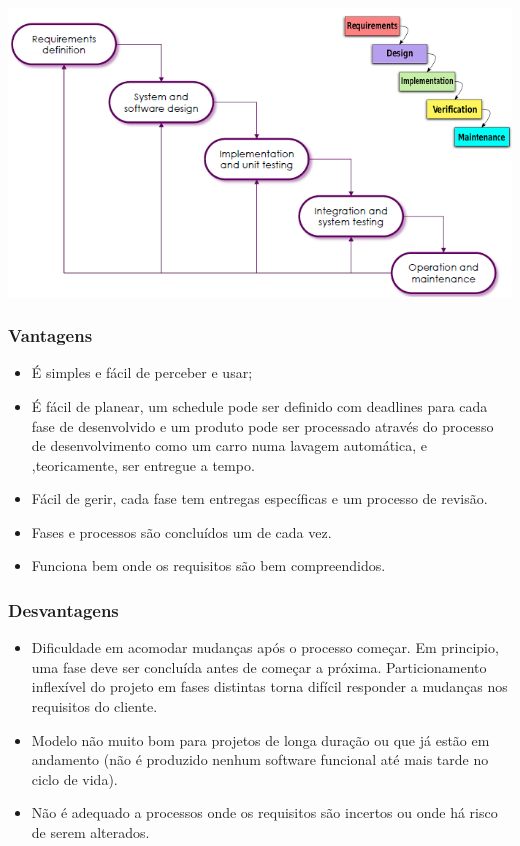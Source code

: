 \documentclass{article}
\begin{document}
\begin{center}
  \includegraphics[scale=0.6]{11}
\end{center}

\subsubsection*{Vantagens}

\begin{itemize}
  \item É simples e fácil de perceber e usar;
  \item É fácil de planear, um schedule pode ser definido
  com deadlines para cada fase de desenvolvido e um produto pode ser
  processado através do processo de desenvolvimento como um carro
  numa lavagem automática, e ,teoricamente, ser entregue a tempo.
  \item Fácil de gerir, cada fase tem entregas específicas e um
  processo de revisão.
  \item Fases e processos são concluídos um de cada vez.
  \item Funciona bem onde os requisitos são bem compreendidos.
\end{itemize}

\subsubsection*{Desvantagens}

\begin{itemize}
  \item Dificuldade em acomodar mudanças após o processo começar.
  Em principio, uma fase deve ser concluída antes de começar a próxima.
  Particionamento inflexível do projeto em fases distintas torna difícil
  responder a mudanças nos requisitos do cliente.
  \item Modelo não muito bom para projetos de longa duração ou que já estão em andamento
  (não é produzido nenhum software funcional até mais tarde no ciclo de vida).
  \item Não é adequado a processos onde os requisitos são incertos ou
  onde há risco de serem alterados.
\end{itemize}
\end{document}
